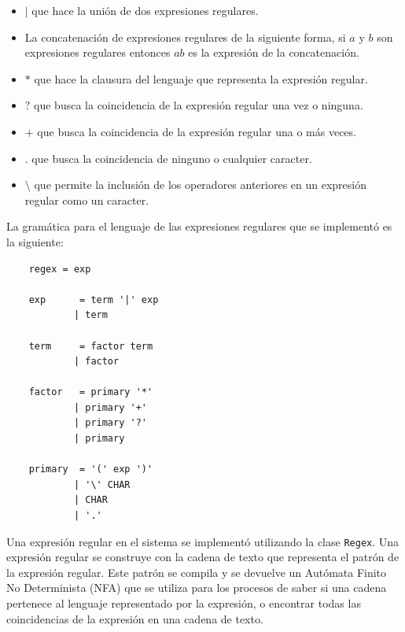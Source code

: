 \begin{itemize}
    \item $|$ que hace la unión de dos expresiones regulares.
    \item La concatenación de expresiones regulares de la siguiente forma, si $a$ y $b$ son expresiones regulares entonces $ab$ es la expresión de la concatenación.
    \item $*$ que hace la clausura del lenguaje que representa la expresión regular.
    \item $?$ que busca la coincidencia de la expresión regular una vez o ninguna.
    \item $+$ que busca la coincidencia de la expresión regular una o más veces.
    \item $.$ que busca la coincidencia de ninguno o cualquier caracter.
    \item $\setminus$  que permite la inclusión de los operadores anteriores en un expresión regular como un caracter.
\end{itemize}

La gramática para el lenguaje de las expresiones regulares que se implementó es la siguiente:

\begin{verbatim}
    regex = exp 

    exp      = term '|' exp    
            | term

    term     = factor term       
            | factor

    factor   = primary '*'      
            | primary '+'       
            | primary '?'       
            | primary

    primary  = '(' exp ')'
            | '\' CHAR              
            | CHAR
            | '.'
\end{verbatim}

Una expresión regular en el sistema se implementó utilizando la clase \verb|Regex|. Una expresión regular se construye con la cadena de texto que representa el patrón de la expresión regular. Este patrón se compila y se devuelve un Autómata Finito No Determinista (NFA) que se utiliza para los procesos de saber si una cadena pertenece al lenguaje representado por la expresión, o encontrar todas las coincidencias de la expresión en una cadena de texto. 

